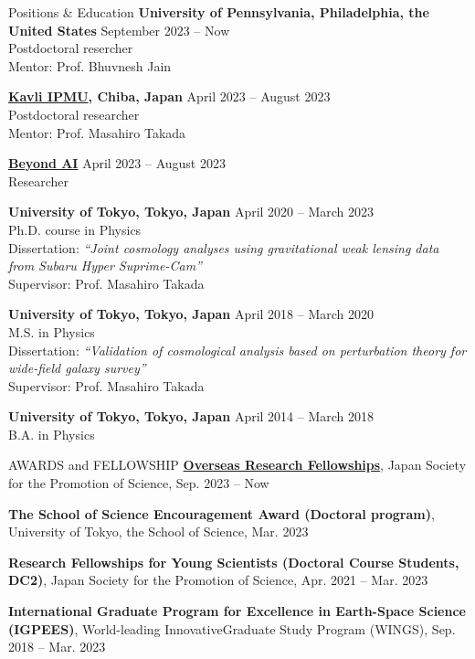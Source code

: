 \documentclass{sty/resume} %
\begin{document}
\begin{rSection}{Positions \& Education}
{\bf University of Pennsylvania, Philadelphia, the United States} \hfill {September 2023 -- Now}\\
Postdoctoral resercher\\
Mentor: Prof. Bhuvnesh Jain

{\bf \href{https://www.ipmu.jp/en}{Kavli IPMU}, Chiba, Japan} \hfill {April 2023 -- August 2023}\\
Postdoctoral researcher\\
Mentor: Prof. Masahiro Takada

{\bf \href{https://beyondai.jp/?lang=en}{Beyond AI}} \hfill {April 2023 -- August 2023}\\
Researcher

{\bf University of Tokyo, Tokyo, Japan}  \hfill {April 2020 -- March 2023}\\
Ph.D. course in Physics\\
Dissertation: \textit{``Joint cosmology analyses using gravitational weak lensing data from Subaru Hyper Suprime-Cam''}\\
Supervisor: Prof. Masahiro Takada

{\bf University of Tokyo, Tokyo, Japan}  \hfill {April 2018 -- March 2020}\\
M.S. in Physics\\
Dissertation: \textit{``Validation of cosmological analysis based on perturbation theory for wide-field galaxy survey''} \\
Supervisor: Prof. Masahiro Takada

{\bf University of Tokyo, Tokyo, Japan}  \hfill {April 2014 -- March 2018}\\
B.A. in Physics

\end{rSection}


\begin{rSection}{AWARDS and FELLOWSHIP}
  \textbf{\href{https://www.jsps.go.jp/english/e-ab/index.html}{Overseas Research Fellowships}}, Japan Society for the Promotion of Science, Sep. 2023 -- Now

  \textbf{The School of Science Encouragement Award (Doctoral program)}, University of Tokyo, the School of Science, Mar. 2023
    
  \textbf{Research Fellowships for Young Scientists (Doctoral Course Students, DC2)}, Japan Society for the Promotion of Science, Apr. 2021 -- Mar. 2023

  \textbf{International Graduate Program for Excellence in Earth-Space Science (IGPEES)}, World-leading InnovativeGraduate Study Program (WINGS), Sep. 2018 -- Mar. 2023
\end{rSection}
\end{document}
